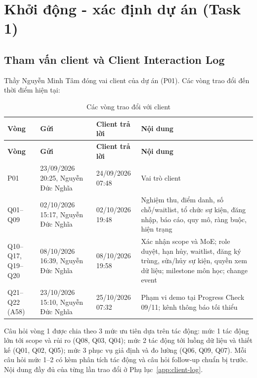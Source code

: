 \chapter{Khởi động - xác định dự án (Task 1)}
\label{chap:task1}

\section{Tham vấn client và Client Interaction Log}
\label{sec:1-1}

Thầy Nguyễn Minh Tâm đóng vai client của dự án (P01). Các vòng trao đổi đến thời điểm hiện tại:

\begingroup\tblsetup\tblzebra
\begin{longtable}{L{1.6cm}L{3.2cm}L{3.2cm}L{6.0cm}}
\caption{Các vòng trao đổi với client}\label{tab:client-rounds}\\
\toprule
{}\textbf{Vòng} & \textbf{Gửi} & \textbf{Client trả lời} & \textbf{Nội dung} \\
\midrule
\endfirsthead
\toprule
{}\textbf{Vòng} & \textbf{Gửi} & \textbf{Client trả lời} & \textbf{Nội dung} \\
\midrule
\endhead
\bottomrule
\endlastfoot
P01 & 23/09/2026 20:25, Nguyễn Đức Nghĩa & 24/09/2026 07:48 & Vai trò client \\
Q01--Q09 & 02/10/2026 15:17, Nguyễn Đức Nghĩa & 02/10/2026 19:48 & Nghiệm thu, điểm danh, số chỗ/waitlist, tổ chức sự kiện, đăng nhập, báo cáo, quy mô, ràng buộc, hiện trạng \\
Q10--Q17, Q19--Q20 & 08/10/2026 16:39, Nguyễn Đức Nghĩa & 08/10/2026 19:58 & Xác nhận scope và MoE; role duyệt, hạn hủy, waitlist, đăng ký trùng, sửa/hủy sự kiện, quyền xem dữ liệu; milestone môn học; change event \\
Q21--Q22 (A58) & 23/10/2026 15:10, Nguyễn Đức Nghĩa & 25/10/2026 07:32 & Phạm vi demo tại Progress Check 09/11; kênh thông báo tối thiểu \\
\end{longtable}
\endgroup

Câu hỏi vòng 1 được chia theo 3 mức ưu tiên dựa trên tác động: mức 1 tác động lớn tới scope và rủi ro (Q08, Q03, Q04); mức 2 tác động tới luồng dữ liệu và thiết kế (Q01, Q02, Q05); mức 3 phục vụ giả định và đo lường (Q06, Q09, Q07). Mỗi câu hỏi mức 1--2 có kèm phân tích tác động và câu hỏi follow-up chuẩn bị trước. Nội dung đầy đủ của từng lần trao đổi ở Phụ lục~\ref{app:client-log}.

